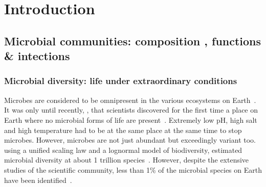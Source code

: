\chapter{Introduction}
\label{cha:intro}



\section{Microbial communities: composition 
, functions 
\& intections 
}
   \subsection{Microbial diversity: life under extraordinary conditions}
   \label{subsec:microbial_diversity}

      Microbes are considered to be omnipresent in the 
      various ecosystems on Earth~\citep{falkowski2008microbial}.
      It was only until recently, \citeyear{belilla2019hyperdiverse}, that scientists discovered for the first time 
      a place on Earth where no microbial forms of life are present~\cite{belilla2019hyperdiverse}.
      Extremely low pH, high salt and high temperature had to be 
      at the same place at the same time to stop microbes.
      However, microbes are not just abundant but 
      exceedingly variant too.
      \citeauthor{locey2016scaling} using a unified scaling law
      and a lognormal model of biodiversity, 
      estimated microbial diversity at about 1 trillion species~\cite{locey2016scaling}.
      However, despite the extensive studies of the scientific community, 
      less than 1\% of the microbial species on Earth have been identified~\cite{isme}.
      
